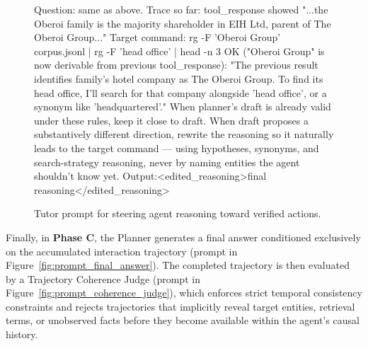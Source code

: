 \documentclass{llmxive}
\begin{document}
\begin{figure}[!t]
\begin{promptbox}
Question: same as above. Trace so far: tool_response showed "...the Oberoi family is the majority shareholder in EIH Ltd, parent of The Oberoi Group..." Target command: rg -F 'Oberoi Group' corpus.jsonl | rg -F 'head office' | head -n 3
OK ("Oberoi Group" is now derivable from previous tool_response): "The previous result identifies family's hotel company as The Oberoi Group. To find its head office, I'll search for that company alongside 'head office', or a synonym like 'headquartered'."
When planner's draft is already valid under these rules, keep it close to draft. When draft proposes a substantively different direction, rewrite the reasoning so it naturally leads to the target command — using hypotheses, synonyms, and search-strategy reasoning, never by naming entities the agent shouldn't know yet.
Output:<edited_reasoning>final reasoning</edited_reasoning>
\end{promptbox}
\vspace{-0.4cm}
\caption{Tutor prompt for steering agent reasoning toward verified actions.}
\label{fig:prompt_tutor_edit}
\end{figure}

Finally, in \textbf{Phase C}, the Planner generates a final answer conditioned exclusively on the accumulated interaction trajectory (prompt in Figure~\ref{fig:prompt_final_answer}). The completed trajectory is then evaluated by a Trajectory Coherence Judge (prompt in Figure~\ref{fig:prompt_coherence_judge}), which enforces strict temporal consistency constraints and rejects trajectories that implicitly reveal target entities, retrieval terms, or unobserved facts before they become available within the agent's causal history.


\end{document}
